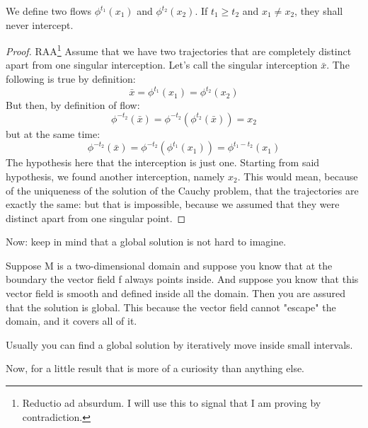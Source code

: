\begin{proposition}
    We define two flows $\phi^{t_1}(x_1)$ and $\phi^{t_2}(x_2)$. If $t_1\geq t_2$ and $x_1\neq x_2$, they shall never intercept. 
    \label{prop:intersection}
\end{proposition}
\begin{proof}
    RAA\footnote{Reductio ad absurdum. I will use this to signal that I am proving by contradiction.} Assume that we have two trajectories that are completely distinct apart from one singular interception. Let's call the singular interception $\bar{x}$. The following is true by definition:
    \begin{equation*}
        \bar{x}=\phi^{t_1}(x_1)=\phi^{t_2}(x_2)
    \end{equation*}
    But then, by definition of flow:
    \begin{equation*}
        \phi^{-t_2}(\bar{x})=\phi^{-t_2}(\phi^{t_2}(\bar{x}))=x_2
    \end{equation*}
    but at the same time:
    \begin{equation*}
        \phi^{-t_2}(\bar{x})=\phi^{-t_2}(\phi^{t_1}(x_1))=\phi^{t_1-t_2}(x_1)
    \end{equation*}
    The hypothesis here that the interception is just one. Starting from said hypothesis, we found another interception, namely $x_2$. This would mean, because of the uniqueness of the solution of the Cauchy problem, that the trajectories are exactly the same: but that is impossible, because we assumed that they were distinct apart from one singular point.
\end{proof}

Now: keep in mind that a global solution is not hard to imagine.

\begin{example}
    Suppose M is a two-dimensional domain and suppose you know that at the boundary the vector field f always points inside. And suppose you know that this vector field is smooth and defined inside all the domain. Then you are assured that the solution is global. This because the vector field cannot "escape" the domain, and it covers all of it. 
\end{example}

Usually you can find a global solution by iteratively move inside small intervals. 

Now, for a little result that is more of a curiosity than anything else.

